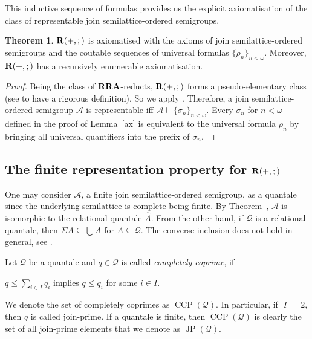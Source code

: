 \documentclass[a4paper]{article}
\theoremstyle{definition}
\theoremstyle{theorem}
\newtheorem{theorem}{Theorem}
\theoremstyle{proposition}
\theoremstyle{lemma}
\theoremstyle{ex}
\theoremstyle{corollary}
\theoremstyle{claim}
\begin{document}
This inductive sequence of formulas provides us the explicit axiomatisation of the class of representable join semilattice-ordered semigroups.

\begin{theorem}
  ${\bf R}(+, ;)$ is axiomatised with the axioms of join semilattice-ordered semigroups and the coutable sequences of universal formulas $\{ \rho_n \}_{n < \omega}$. Moreover, ${\bf R}(+, ;)$ has a recursively enumerable axiomatisation.
\end{theorem}

\begin{proof}
  Being the class of ${\bf RRA}$-reducts, ${\bf R}(+, ;)$ forms a pseudo-elementary class (see \cite{eklof1977ultraproducts} to have a rigorous definition). So we apply \cite[Theorem 9.28]{hirsch2002relation}. Therefore, a join semilattice-ordered semigroup $\mathcal{A}$ is representable iff $\mathcal{A} \models \{ \sigma_n \}_{n < \omega}$.
  Every $\sigma_n$ for $n < \omega$ defined in the proof of Lemma~\ref{ax} is equivalent to the universal formula $\rho_n$ by bringing all universal quantifiers into the prefix of $\sigma_n$.
\end{proof}

\subsection{The finite representation property for ${\bf R}(+, ;)$}

One may consider $\mathcal{A}$, a finite join semilattice-ordered semigroup, as a quantale since the underlying semilattice is complete being finite. By Theorem~\label{quantaleRep}, $\mathcal{A}$ is isomorphic to the relational quantale $\widehat{A}$. From the other hand, if $\mathcal{Q}$ is a relational quantale, then $\Sigma A \subseteq \bigcup A$ for $A \subseteq \mathcal{Q}$. The converse inclusion does not hold in general, see \cite[Remark 3.2 and Example 3.6]{brown1993representation}.

Let $\mathcal{Q}$ be a quantale and $q \in \mathcal{Q}$ is called \emph{completely coprime}, if
\begin{center}
  $q \leq \sum \limits_{i \in I} q_i$ implies $q \leq q_i$ for some $i \in I$.
\end{center}
We denote the set of completely coprimes as $\operatorname{CCP}(\mathcal{Q})$.
In particular, if $|I| = 2$, then $q$ is called join-prime. If a quantale is finite, then $\operatorname{CCP}(\mathcal{Q})$ is clearly the set of all join-prime elements that we denote as $\operatorname{JP}(\mathcal{Q})$.
\end{document}
